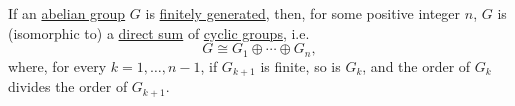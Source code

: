 \begin{theorem}\label{thm:fundamental_theorem_of_finitely_generated_abelian_groups}
  If an \hyperref[def:abelian_group]{abelian group} \( G \) is \hyperref[def:semimodule/generated]{finitely generated}, then, for some positive integer \( n \), \( G \) is (isomorphic to) a \hyperref[def:semimodule_direct_sum]{direct sum} of \hyperref[def:cyclic_group]{cyclic groups}, i.e.
  \begin{equation}\label{eq:thm:fundamental_theorem_of_finitely_generated_abelian_groups}
    G \cong G_1 \oplus \cdots \oplus G_n,
  \end{equation}
  where, for every \( k = 1, \ldots, n - 1 \), if \( G_{k+1} \) is finite, so is \( G_k \), and the order of \( G_k \) divides the order of \( G_{k+1} \).
\end{theorem}
